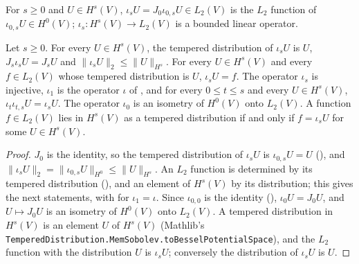 \begin{definition}[$L_2$ functions of $H^s(V)$]
\label{def:sobolev-to-l2}
\leanok
{}
For $s \geq 0$ and $U \in H^s(V)$, $\iota_s U = J_0 \iota_{0,s} U \in L_2(V)$ is the $L_2$
function of $\iota_{0,s} U \in H^0(V)$; $\iota_s : H^s(V) \to L_2(V)$ is a bounded linear
operator.
\end{definition}

\begin{lemma}
\label{lem:sobolev-to-l2}
\leanok
{}
Let $s \geq 0$. For every $U \in H^s(V)$, the tempered distribution of $\iota_s U$ is $U$,
$J_s \iota_s U = J_s U$ and $\|\iota_s U\|_2 \leq \|U\|_{H^s}$. For every $U \in H^s(V)$ and
every $f \in L_2(V)$ whose tempered distribution is $U$, $\iota_s U = f$. The operator
$\iota_s$ is injective, $\iota_1$ is the operator $\iota$ of , and
for every $0 \leq t \leq s$ and every $U \in H^s(V)$, $\iota_t \iota_{t,s} U = \iota_s U$. The
operator $\iota_0$ is an isometry of $H^0(V)$ onto $L_2(V)$. A function $f \in L_2(V)$ lies in
$H^s(V)$ as a tempered distribution if and only if $f = \iota_s U$ for some $U \in H^s(V)$.
\end{lemma}

\begin{proof}
\leanok
$J_0$ is the identity, so the tempered distribution of $\iota_s U$ is $\iota_{0,s} U = U$
(), and $\|\iota_s U\|_2 = \|\iota_{0,s} U\|_{H^0} \leq
\|U\|_{H^s}$. An $L_2$ function is determined by its tempered distribution
(), and an element of $H^s(V)$ by its distribution; this
gives the next statements, with  for $\iota_1 = \iota$. Since
$\iota_{0,0}$ is the identity (), $\iota_0 U = J_0 U$, and
$U \mapsto J_0 U$ is an isometry of $H^0(V)$ onto $L_2(V)$. A tempered distribution in $H^s(V)$
is an element $U$ of $H^s(V)$ (Mathlib's
\texttt{TemperedDistribution.\allowbreak MemSobolev.\allowbreak toBesselPotentialSpace}), and the
$L_2$ function with the distribution $U$ is $\iota_s U$; conversely the distribution of
$\iota_s U$ is $U$.
\end{proof}

